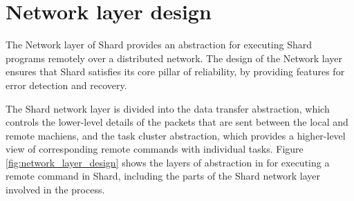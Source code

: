 \documentclass[twoside]{report}
\begin{document}
\section{Network layer design}


The Network layer of Shard provides an abstraction for executing Shard programs remotely over a distributed network.
The design of the Network layer ensures that Shard satisfies its core pillar of reliability, by providing features for error detection and recovery.

The Shard network layer is divided into the data transfer abstraction, which controls the lower-level details of the packets that are sent between the local and remote machiens, and the task cluster abstraction, which provides a higher-level view of corresponding remote commands with individual tasks.
Figure \ref{fig:network_layer_design} shows the layers of abstraction in for executing a remote command in Shard, including the parts of the Shard network layer involved in the process.
\end{document}
